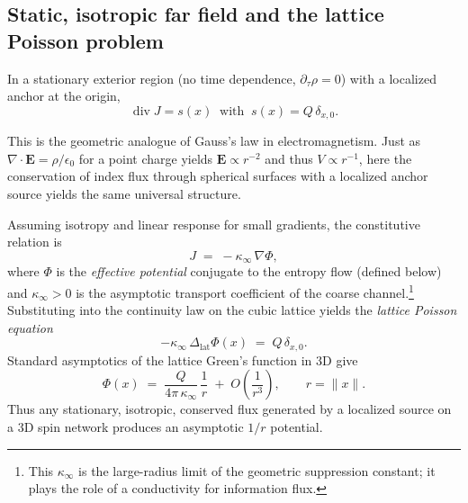 \documentclass[11pt]{article}
\theoremstyle{plain}
\theoremstyle{definition}
\begin{document}
\subsection{Static, isotropic far field and the lattice Poisson problem}
In a stationary exterior region (no time dependence, \(\partial_\tau \rho=0\)) with a localized anchor at the origin,
\[
  \operatorname{div} J = s(x) \;\; \text{with} \;\; s(x)=Q\,\delta_{x,0}.
\]

This is the geometric analogue of Gauss's law in electromagnetism. Just as $\nabla \cdot \mathbf{E} = \rho/\epsilon_0$ for a point charge yields $\mathbf{E} \propto r^{-2}$ and thus $V \propto r^{-1}$, here the conservation of index flux through spherical surfaces with a localized anchor source yields the same universal structure.

Assuming isotropy and linear response for small gradients, the constitutive relation is
\[
  J \;=\; -\kappa_\infty \,\nabla \Phi,
\]
where $\Phi$ is the \emph{effective potential} conjugate to the entropy flow (defined below) and $\kappa_\infty>0$ is the asymptotic transport coefficient of the coarse channel.\footnote{This $\kappa_\infty$ is the large-radius limit of the geometric suppression constant; it plays the role of a conductivity for information flux.}
Substituting into the continuity law on the cubic lattice yields the \emph{lattice Poisson equation}
\begin{equation}\label{eq:lattice-poisson}
  -\kappa_\infty \,\Delta_{\mathrm{lat}} \Phi(x) \;=\; Q\,\delta_{x,0}.
\end{equation}
Standard asymptotics of the lattice Green’s function in 3D give
\[
  \Phi(x) \;=\; \frac{Q}{4\pi\,\kappa_\infty}\,\frac{1}{r} \;+\; O\!\left(\frac{1}{r^3}\right)\!, \qquad r=\|x\|.
\]
Thus any stationary, isotropic, conserved flux generated by a localized source on a 3D spin network produces an asymptotic \(1/r\) potential.
\end{document}
